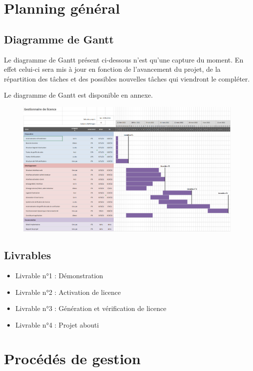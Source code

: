\chapter{Planning général}

\section{Diagramme de Gantt}

Le diagramme de Gantt présent ci-dessous n'est qu'une capture du moment. En effet celui-ci sera
mis à jour en fonction de l'avancement du projet, de la répartition des tâches et des possibles
nouvelles tâches qui viendront le compléter.\newline

Le diagramme de Gantt est disponible en annexe.

\begin{figure}[!h]
    \centering
    \includegraphics[width=17cm]{Gantt.png}
\end{figure}

\section{Livrables}
\begin{itemize}
	\item Livrable n°1 : Démonstration
	\item Livrable n°2 : Activation de licence
	\item Livrable n°3 : Génération et vérification de licence
	\item Livrable n°4 : Projet abouti
\end{itemize}

\chapter{Procédés de gestion}

